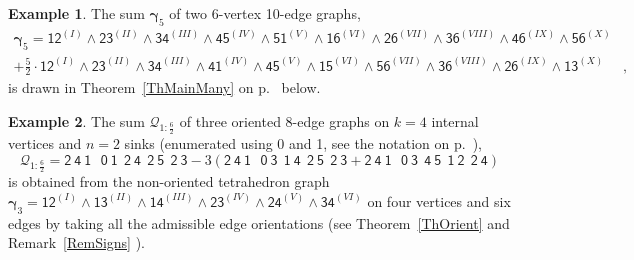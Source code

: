 \documentclass[a4paper]{jpconf}%
\theoremstyle{definition}
\newtheorem{example}{Example}%
\theoremstyle{remark}
\newcommand{\cQ}{\mathcal{Q}}
\begin{document}
\begin{example}\label{Ex5Wheel}
The sum $\boldsymbol{\gamma}_5$ of two 6-vertex 10-edge graphs,
\begin{align*}
\boldsymbol{\gamma}_5 = \mathsf{12}^{(I)}\wedge \mathsf{23}^{(II)}\wedge \mathsf{34}^{(III)}\wedge \mathsf{45}^{(IV)} \wedge \mathsf{51}^{(V)} \wedge \mathsf{16}^{(VI)} \wedge \mathsf{26}^{(VII)}\wedge \mathsf{36}^{(VIII)}\wedge \mathsf{46}^{(IX)}\wedge \mathsf{56}^{(X)}&\\
 + \tfrac{5}{2}\cdot \mathsf{12}^{(I)}\wedge \mathsf{23}^{(II)}\wedge \mathsf{34}^{(III)} \wedge \mathsf{41}^{(IV)}\wedge \mathsf{45}^{(V)}\wedge \mathsf{15}^{(VI)}\wedge \mathsf{56}^{(VII)}\wedge \mathsf{36}^{(VIII)}\wedge \mathsf{26}^{(IX)}\wedge \mathsf{13}^{(X)}&,
\end{align*}
is drawn in Theorem~\ref{ThMainMany} on p.~\pageref{Where5WheelIs} %
below.
\end{example}

\begin{example}\label{Ex3Wheel}
The sum $\cQ_{1:\frac{6}{2}}$ of three oriented 8-edge graphs on $k=4$ internal vertices and $n=2$ sinks (enumerated using 0 and 1, see the notation on p.~\pageref{DefEncodingKgraph}),
$$\cQ_{1:\frac{6}{2}} = \mathsf{2\ 4\ 1\ \ \ 0\ 1\ \ 2\ 4\ \ 2\ 5\ \ 2\ 3} - 3(\mathsf{2\ 4\ 1\ \ \ 0\ 3\ \ 1\ 4\ \ 2\ 5\ \ 2\ 3} + \mathsf{2\ 4\ 1\ \ \ 0\ 3\ \ 4\ 5\ \ 1\ 2\ \ 2\ 4})$$
is obtained from the non-oriented tetrahedron graph $\boldsymbol{\gamma}_3 = %
\mathsf{12}^{(I)}\wedge \mathsf{13}^{(II)}\wedge \mathsf{14}^{(III)}\wedge \mathsf{23}^{(IV)}\wedge \mathsf{24}^{(V)}\wedge \mathsf{34}^{(VI)}$ on four vertices and six edges by taking all the admissible edge orientations 
(see Theorem~\ref{ThOrient} and Remark~\ref{RemSigns}%
). 
\end{example}
\end{document}
